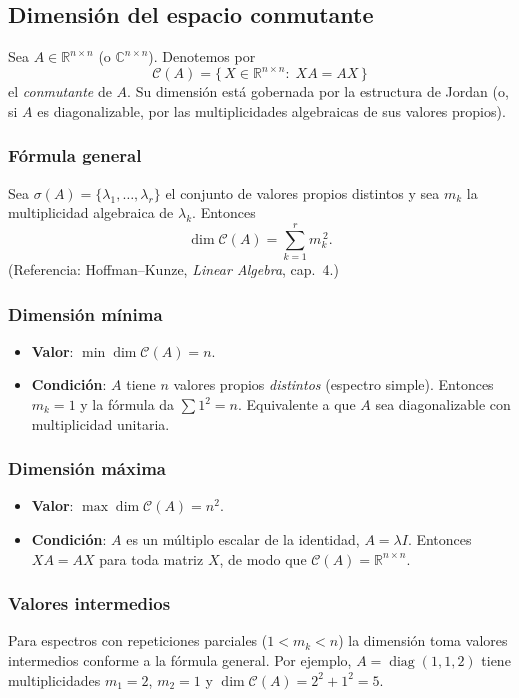 \subsection{Dimensión del espacio conmutante}

Sea $A\in\mathbb{R}^{n\times n}$ (o $\mathbb{C}^{n\times n}$). Denotemos por
\[
\mathcal{C}(A)=\{\,X\in\mathbb{R}^{n\times n}:\; XA=AX\,\}
\]
el \emph{conmutante} de $A$.  Su dimensión está gobernada por la
estructura de Jordan (o, si $A$ es diagonalizable, por las multiplicidades
algebraicas de sus valores propios).

\subsubsection{Fórmula general}
Sea $\sigma(A)=\{\lambda_1,\dots,\lambda_r\}$ el conjunto de valores propios
distintos y sea $m_k$ la multiplicidad algebraica de $\lambda_k$. Entonces
\[
\dim \mathcal{C}(A)=\sum_{k=1}^{r} m_k^{\,2}.
\]
(Referencia: Hoffman–Kunze, \emph{Linear Algebra}, cap.~4.)

\subsubsection{Dimensión mínima}
\begin{itemize}
  \item \textbf{Valor}: $\min \dim\mathcal{C}(A)=n$.
  \item \textbf{Condición}: $A$ tiene $n$ valores propios \emph{distintos}
        (espectro simple).  Entonces $m_k=1$ y la fórmula da
        $\sum 1^{2}=n$.  Equivalente a que $A$ sea diagonalizable con
        multiplicidad unitaria.
\end{itemize}

\subsubsection{Dimensión máxima}
\begin{itemize}
  \item \textbf{Valor}: $\max \dim\mathcal{C}(A)=n^{2}$.
  \item \textbf{Condición}: $A$ es un múltiplo escalar de la identidad,
        $A=\lambda I$. Entonces $XA=AX$ para toda matriz $X$, de modo que
        $\mathcal{C}(A)=\mathbb{R}^{n\times n}$.
\end{itemize}

\subsubsection{Valores intermedios}
Para espectros con repeticiones parciales ($1<m_k<n$) la dimensión toma
valores intermedios conforme a la fórmula general.  Por ejemplo,
$A=\operatorname{diag}(1,1,2)$ tiene multiplicidades $m_1=2$, $m_2=1$ y
$\dim\mathcal{C}(A)=2^{2}+1^{2}=5$.